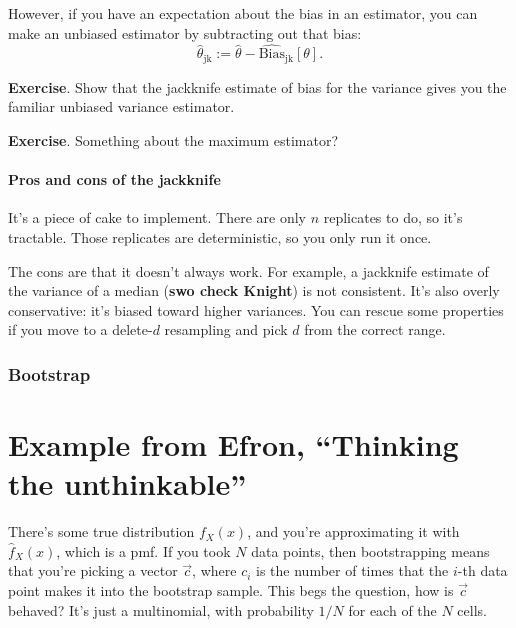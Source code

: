 \documentclass{book}
\begin{document}
However, if you have an expectation about the bias in an estimator, you
can make an unbiased estimator by subtracting out that bias: \[
\hat{\theta}_\mathrm{jk} := \hat{\theta} - \widehat{\mathrm{Bias}}_\mathrm{jk}[\theta].
\]

\textbf{Exercise}. Show that the jackknife estimate of bias for the
variance gives you the familiar unbiased variance estimator.

\textbf{Exercise}. Something about the maximum estimator?

\paragraph{Pros and cons of the
jackknife}\label{pros-and-cons-of-the-jackknife}

It's a piece of cake to implement. There are only \(n\) replicates to
do, so it's tractable. Those replicates are deterministic, so you only
run it once.

The cons are that it doesn't always work. For example, a jackknife
estimate of the variance of a median (\textbf{swo check Knight}) is not
consistent. It's also overly conservative: it's biased toward higher
variances. You can rescue some properties if you move to a delete-\(d\)
resampling and pick \(d\) from the correct range.

\subsubsection{Bootstrap}\label{bootstrap}

\section{Example from Efron, ``Thinking the unthinkable''}

There's some true distribution $f_X(x)$, and you're approximating it with
$\hat{f}_X(x)$, which is a pmf. If you took $N$ data points, then bootstrapping
means that you're picking a vector $\vec{c}$, where $c_i$ is the number of
times that the $i$-th data point makes it into the bootstrap sample. This
begs the question, how is $\vec{c}$ behaved? It's just a multinomial, with
probability $1/N$ for each of the $N$ cells.
\end{document}
